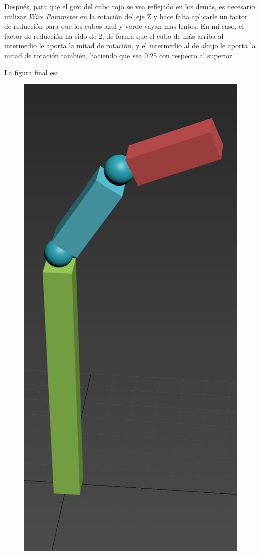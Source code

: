 \documentclass{article}
\begin{document}
Después, para que el giro del cubo rojo se vea reflejado en los demás, es necesario utilizar \textit{Wire Parameter} en la rotación del eje Z y hace falta aplicarle un factor de reducción para que los cubos azul y verde vayan más lentos. En mi caso, el factor de reducción ha sido de 2, de forma que el cubo de más arriba al intermedio le aporta la mitad de rotación, y el intermedio al de abajo le aporta la mitad de rotación también, haciendo que sea 0.25 con respecto al superior.

\bigskip

La figura final es:

\begin{figure}[H]
   \centering
   \includegraphics[width=\textwidth]{imagenes/brazo1mio.png}

\end{figure}
\end{document}
